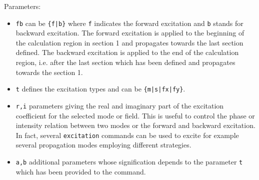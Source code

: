    Parameters:
    \begin{itemize}
    \item\lstinline!fb! can be \lstinline!{f|b}! where \lstinline!f! indicates the forward excitation and \lstinline!b! 
            stands for backward excitation. The forward excitation is applied
            to the beginning of the calculation region in section 1 and 
            propagates towards the last section defined.
            The backward excitation is applied to the end of the calculation 
            region, i.e. after the last section which has been 
            defined and propagates towards the section 1.
    \item\lstinline!t!      defines the excitation types and can be \lstinline!{m|s|fx|fy}!. 
    \item\lstinline!r,i! parameters giving the real and imaginary part of the excitation coefficient for the selected mode or field. This is useful to control the phase or intensity relation between two modes or the forward and backward excitation. In fact, several  \lstinline!excitation! commands can be used to excite for example several propagation modes employing different strategies.
    \item\lstinline!a,b! additional parameters whose signification depends to the parameter \lstinline!t! which has been provided to the command.
\end{itemize}

